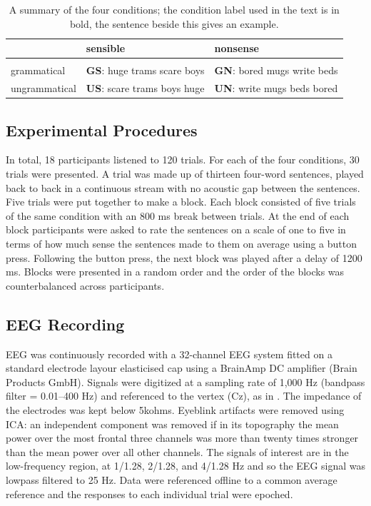 \documentclass[a4paper,10pt,twoside]{article}
\begin{document}
\begin{table}
\begin{tabular}{l|ll}
&sensible&nonsense\\
\hline\\
grammatical&\textbf{GS}: huge trams scare boys&\textbf{GN}: bored mugs write beds\\
ungrammatical &\textbf{US}: scare trams boys huge&\textbf{UN}: write mugs beds bored
\end{tabular}
\caption{A summary of the four conditions; the condition label used in the text is in
  bold, the sentence beside this gives an
  example.\label{tab:conditions}}
\end{table}

\subsection*{Experimental Procedures}

In total, 18 participants listened to 120 trials. For each of the four
conditions, 30 trials were presented. A trial was made up of thirteen
four-word sentences, played back to back in a continuous stream with
no acoustic gap between the sentences. Five trials were put together
to make a block. Each block consisted of five trials of the same
condition with an 800 ms break between trials. At the end of each
block participants were asked to rate the sentences on a scale of one
to five in terms of how much sense the sentences made to them on
average using a button press. Following the button press, the next
block was played after a delay of 1200 ms. Blocks were presented in a
random order and the order of the blocks was counterbalanced across
participants.

\subsection*{EEG Recording}

EEG was continuously recorded with a 32-channel EEG system fitted on a
standard electrode layour elasticised cap using a BrainAmp DC
amplifier (Brain Products GmbH). Signals were digitized at a sampling
rate of 1,000 Hz (bandpass filter = 0.01–400 Hz) and referenced to the
vertex (Cz), as in \cite{DingEtAl2017}. The impedance of the
electrodes was kept below 5kohms. Eyeblink artifacts were removed
using ICA: an independent component was removed if in its topography
the mean power over the most frontal three channels was more than
twenty times stronger than the mean power over all other channels. The
signals of interest are in the low-frequency region, at 1/1.28,
2/1.28, and 4/1.28 Hz and so the EEG signal was lowpass filtered to 25
Hz. Data were referenced offline to a common average reference and the
responses to each individual trial were epoched.
\end{document}
